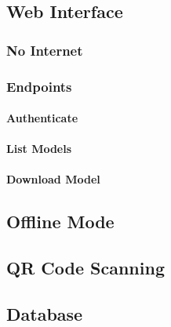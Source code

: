     \subsection{Web Interface}

        \subsubsection{No Internet}

        \subsubsection{Endpoints}

            \paragraph{Authenticate}

            \paragraph{List Models}

            \paragraph{Download Model}
        
    \subsection{Offline Mode}

    \subsection{QR Code Scanning}

    \subsection{Database}
